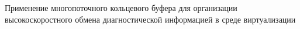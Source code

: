 Применение многопоточного кольцевого буфера для организации высокоскоростного обмена диагностической информацией в среде виртуализации